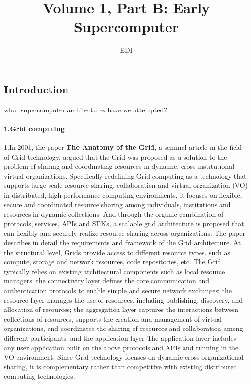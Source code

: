 \documentclass[a4paper,twoside]{scrbook}
\begin{document}
\begin{CJK}{UTF8}{gbsn}
\title{Volume 1, Part B: Early Supercomputer}
\author{EDI}

\frontmatter
\maketitle
\tableofcontents
\mainmatter

\chapter{Introduction}

what supercomputer architectures have we attempted?

\subsubsection{1.Grid computing}
1.In 2001, the paper \textbf {The Anatomy of the Grid}\cite{foster2001anatomy}, a seminal article in the field of Grid technology, argued that the Grid was proposed as a solution to the problem of sharing and coordinating resources in dynamic, cross-institutional virtual organizations. Specifically redefining Grid computing as a technology that supports large-scale resource sharing, collaboration and virtual organization (VO) in distributed, high-performance computing environments, it focuses on flexible, secure and coordinated resource sharing among individuals, institutions and resources in dynamic collections. And through the organic combination of protocols, services, APIs and SDKs, a scalable grid architecture is proposed that can flexibly and securely realize resource sharing across organizations. The paper describes in detail the requirements and framework of the Grid architecture. At the structural level, Grids provide access to different resource types, such as compute, storage and network resources, code repositories, etc. The Grid typically relies on existing architectural components such as local resource managers; the connectivity layer defines the core communication and authentication protocols to enable simple and secure network exchanges; the resource layer manages the use of resources, including publishing, discovery, and allocation of resources; the aggregation layer captures the interactions between collections of resources, supports the creation and management of virtual organizations, and coordinates the sharing of resources and collaboration among different participants; and the application layer The application layer includes any user application built on the above protocols and APIs and running in the VO environment. Since Grid technology focuses on dynamic cross-organizational sharing, it is complementary rather than competitive with existing distributed computing technologies.



\end{CJK}
\end{document}
